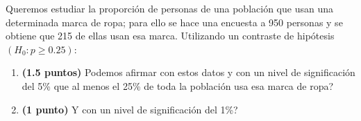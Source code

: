 
Queremos estudiar la proporción de personas de una población que usan una determinada marca de ropa; para ello se hace una encuesta a 950 personas y se obtiene que 215 de ellas usan esa marca. Utilizando un contraste de hipótesis $(H_0:p\geq0.25)$:
\begin{enumerate}[label=\alph*)]
\item \textbf{(1.5 puntos)} \textquestiondown{}Podemos afirmar con estos datos y con un nivel de significación del 5\% que al menos el 25\% de toda la población usa esa marca de ropa?
\item \textbf{(1 punto)} \textquestiondown{}Y con un nivel de significación del 1\%?
\end{enumerate}
